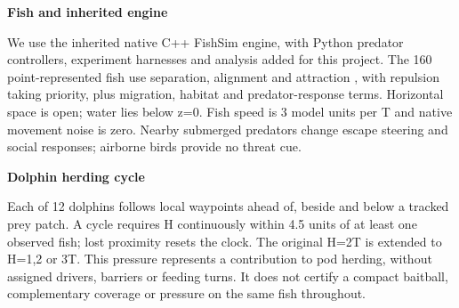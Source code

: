 \documentclass[10pt,a4paper]{article}
\begin{document}
\begin{minipage}[t]{238.10999999999999pt}\vspace{0pt}
\textbf{Fish and inherited engine}\par We use the inherited native C++ FishSim engine, with Python predator controllers, experiment harnesses and analysis added for this project. The 160 point-represented fish use separation, alignment and attraction \citep{couzin2002}, with repulsion taking priority, plus migration, habitat and predator-response terms. Horizontal space is open; water lies below z=0. Fish speed is 3 model units per T and native movement noise is zero. Nearby submerged predators change escape steering and social responses; airborne birds provide no threat cue.\par\smallskip
\textbf{Dolphin herding cycle}\par Each of 12 dolphins follows local waypoints ahead of, beside and below a tracked prey patch. A cycle requires H continuously within 4.5 units of at least one observed fish; lost proximity resets the clock. The original H=2T is extended to H=1,2 or 3T. This pressure represents a contribution to pod herding, without assigned drivers, barriers or feeding turns. It does not certify a compact baitball, complementary coverage or pressure on the same fish throughout.\par\smallskip
\end{minipage}
\hfill
\end{document}
